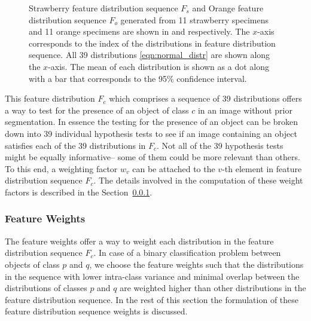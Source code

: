 \documentclass {udthesis}
\begin{document}
\begin{figure}
\begin{subfigure}[]{0.8\textwidth}
      \caption{}
      \label{fig:feat_distr_orange}
  \end{subfigure}
\caption[Feature distribution]{Strawberry feature distribution sequence $F_s$ and Orange feature distribution sequence $F_o$ generated from 11 strawberry specimens and 11 orange specimens are shown in  and  respectively. The $x$-axis corresponds to the index of the distributions in feature distribution sequence. All 39 distributions \eqref{eqn:normal_distr} are shown along the $x$-axis. The  mean of each distribution is shown as a dot along with a bar that corresponds to the 95\% confidence interval.}
\label{fig:feat_distr}
\end{figure}	
%

This feature distribution $F_c$ which comprises a sequence of 39 distributions offers a way to test for the presence of an object of class $c$ in an image without prior segmentation. In essence the testing for the presence of an object can be broken down into 39 individual hypothesis tests to see if an image containing an object satisfies each of the 39 distributions in $F_c$. Not all of the 39 hypothesis tests might be equally informative-- some of them could be more relevant than others. To this end, a weighting factor $w_{v}$ can be attached to the $v$-th element in feature distribution sequence $F_c$.  The details involved in the computation of these weight factors is described in the Section~\ref{sec:distdes_feat_wts}.

\subsubsection{Feature Weights}
\label{sec:distdes_feat_wts}

The feature weights offer a way to weight each distribution in the feature distribution sequence $F_c$. In case of a binary classification problem between objects of class $p$ and $q$, we choose the feature weights such that the distributions in the sequence with lower intra-class variance and minimal overlap between the distributions of classes $p$ and $q$ are weighted higher than other distributions in the feature distribution sequence. In the rest of this section the formulation of these feature distribution sequence weights is discussed.
\end{document}
